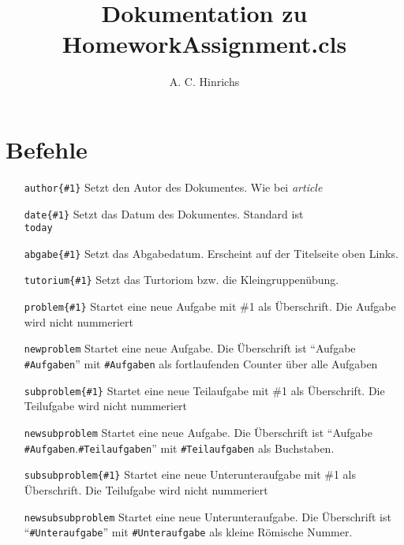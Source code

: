 \documentclass[a4papr]{article}
\title{Dokumentation zu HomeworkAssignment.cls}
\author{A. C. Hinrichs}
\begin{document}
\maketitle
\section{Befehle}
\begin{itemize}
 \item[\texttt{author\{\#1\}}]		Setzt den Autor des Dokumentes. Wie bei \textit{article}
 \item[\texttt{date\{\#1\}}]		Setzt das Datum des Dokumentes. Standard ist \texttt{\\today}
 \item[\texttt{abgabe\{\#1\}}]		Setzt das Abgabedatum. Erscheint auf der Titelseite oben Links.
 \item[\texttt{tutorium\{\#1\}}]	Setzt das Turtoriom bzw. die Kleingruppen\"ubung.	
 \item[\texttt{problem\{\#1\}}] 	Startet eine neue Aufgabe mit \#1 als \"Uberschrift.  Die Aufgabe wird nicht nummeriert
 \item[\texttt{newproblem}] 		Startet eine neue Aufgabe. Die \"Uberschrift ist \enquote{Aufgabe \texttt{\#Aufgaben}} mit \texttt{\#Aufgaben} als fortlaufenden Counter \"uber alle Aufgaben
 \item[\texttt{subproblem\{\#1\}}] 	Startet eine neue Teilaufgabe mit \#1 als \"Uberschrift.  Die Teilufgabe wird nicht nummeriert
 \item[\texttt{newsubproblem}] 		Startet eine neue Aufgabe. Die \"Uberschrift ist \enquote{Aufgabe \texttt{\#Aufgaben}.\texttt{\#Teilaufgaben}} mit \texttt{\#Teilaufgaben} als Buchstaben.
 \item[\texttt{subsubproblem\{\#1\}}] 	Startet eine neue Unterunteraufgabe mit \#1 als \"Uberschrift.  Die Teilufgabe wird nicht nummeriert
 \item[\texttt{newsubsubproblem}] 	Startet eine neue Unterunteraufgabe. Die \"Uberschrift ist \enquote{\texttt{\#Unteraufgabe}} mit \texttt{\#Unteraufgabe} als kleine R\"omische Nummer.
\end{itemize}
\end{document}
